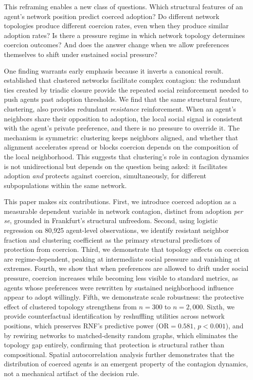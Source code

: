 \documentclass[11pt, a4paper]{article}
\newcommand{\OR}{\text{OR}}
\begin{document}
This reframing enables a new class of questions. Which structural features of an agent's network position predict coerced adoption? Do different network topologies produce different coercion rates, even when they produce similar adoption rates? Is there a pressure regime in which network topology determines coercion outcomes? And does the answer change when we allow preferences themselves to shift under sustained social pressure?

One finding warrants early emphasis because it inverts a canonical result. \citet{centola2007complex, centola2010spread} established that clustered networks facilitate complex contagion: the redundant ties created by triadic closure provide the repeated social reinforcement needed to push agents past adoption thresholds. We find that the same structural feature, clustering, also provides redundant \textit{resistance} reinforcement. When an agent's neighbors share their opposition to adoption, the local social signal is consistent with the agent's private preference, and there is no pressure to override it. The mechanism is symmetric: clustering keeps neighbors aligned, and whether that alignment accelerates spread or blocks coercion depends on the composition of the local neighborhood. This suggests that clustering's role in contagion dynamics is not unidirectional but depends on the question being asked: it facilitates adoption \textit{and} protects against coercion, simultaneously, for different subpopulations within the same network.

This paper makes six contributions. First, we introduce coerced adoption as a measurable dependent variable in network contagion, distinct from adoption \textit{per se}, grounded in Frankfurt's structural unfreedom. Second, using logistic regression on 80{,}925 agent-level observations, we identify resistant neighbor fraction and clustering coefficient as the primary structural predictors of protection from coercion. Third, we demonstrate that topology effects on coercion are regime-dependent, peaking at intermediate social pressure and vanishing at extremes. Fourth, we show that when preferences are allowed to drift under social pressure, coercion increases while becoming less visible to standard metrics, as agents whose preferences were rewritten by sustained neighborhood influence appear to adopt willingly. Fifth, we demonstrate scale robustness: the protective effect of clustered topology strengthens from $n = 300$ to $n = 2{,}000$. Sixth, we provide counterfactual identification by reshuffling utilities across network positions, which preserves RNF's predictive power ($\OR = 0.581$, $p < 0.001$), and by rewiring networks to matched-density random graphs, which eliminates the topology gap entirely, confirming that protection is structural rather than compositional. Spatial autocorrelation analysis further demonstrates that the distribution of coerced agents is an emergent property of the contagion dynamics, not a mechanical artifact of the decision rule.
\end{document}
